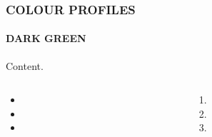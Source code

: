 \documentclass[aspectratio=169]{beamer}
\begin{document}
\begin{frame}[t,colourprofile={Dark Green}]
    \frametitle{COLOUR PROFILES}
    \framesubtitle{DARK GREEN}

    Content.
    \lipsum[1][1-2]

    \begin{columns}[T]
        \begin{column}{0.5\textwidth}
            \begin{itemize}
                \item \lipsum[1][2]
                \item \lipsum[2][2]
                \item \lipsum[3][2]
            \end{itemize}
        \end{column}

        \begin{column}{0.5\textwidth}
            \begin{enumerate}
                \item \lipsum[3][1]
                \item \lipsum[4][2]
                \item \lipsum[5][2]
            \end{enumerate}
        \end{column}
    \end{columns}
\end{frame}
\end{document}
